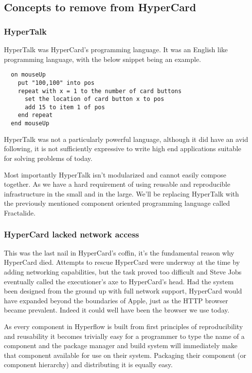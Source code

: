 \documentclass[%
 aip,
 jmp,%
 amsmath,amssymb,
 reprint,%
]{revtex4-1}
\begin{document}
\subsection{\label{sec:level2}Concepts to remove from HyperCard}
\subsubsection{\label{sec:level3}HyperTalk}
HyperTalk was HyperCard's programming language. It was an English like programming language, with the below snippet being an example.
\begin{lstlisting}
  on mouseUp
    put "100,100" into pos
    repeat with x = 1 to the number of card buttons
      set the location of card button x to pos
      add 15 to item 1 of pos
    end repeat
  end mouseUp
\end{lstlisting}

HyperTalk was not a particularly powerful language, although it did have an avid following, it is not sufficiently expressive to write high end applications suitable for solving problems of today.



Most importantly HyperTalk isn't modularized and cannot easily compose together. As we have a hard requirement of using reusable and reproducible infrastructure in the small and in the large. We'll be replacing HyperTalk with the previously mentioned component oriented programming language called Fractalide.

\subsubsection{\label{sec:level3}HyperCard lacked network access}

This was the last nail in HyperCard's coffin, it's the fundamental reason why HyperCard died. Attempts to rescue HyperCard were underway at the time by adding networking capabilities, but the task proved too difficult and Steve Jobs eventually called the executioner's axe to HyperCard's head. Had the system been designed from the ground up with full network support, HyperCard would have expanded beyond the boundaries of Apple, just as the HTTP browser became prevalent. Indeed it could well have been the browser we use today.

As every component in Hyperflow is built from first principles of reproducibility and reusability it becomes trivially easy for a programmer to type the name of a component and the package manager and build system will immediately make that component available for use on their system. Packaging their component (or component hierarchy) and distributing it is equally easy.
\end{document}
